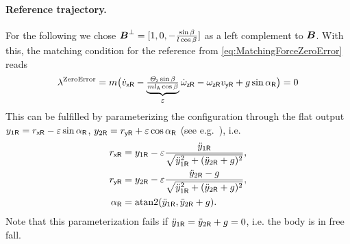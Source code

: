 
\paragraph{Reference trajectory.}
For the following we chose $\boldsymbol{B}^\bot = [1, 0, -\tfrac{\sin\beta}{l \cos\beta}]$ as a left complement to $\boldsymbol{B}$.
With this, the matching condition for the reference from \eqref{eq:MatchingForceZeroError} reads
\begin{align}
 \lambda^{\text{ZeroError}} = m \big(\dot{v}_{\mathsf{x}\mathsf{R}} - \underbrace{\tfrac{\varTheta_{\mathsf{z}} \sin\beta}{m l_{\mathsf{A}} \cos\beta}}_{\varepsilon} \dot{\omega}_{\mathsf{z}\mathsf{R}} - \omega_{\mathsf{z}\mathsf{R}} v_{\mathsf{y}\mathsf{R}} + g \sin\alpha_{\mathsf{R}} \big) = 0
\end{align}
This can be fulfilled by parameterizing the configuration through the flat output $y_{1\mathsf{R}} = r_{\mathsf{x}\mathsf{R}} - \varepsilon \sin\alpha_{\mathsf{R}}$, $y_{2\mathsf{R}} = r_{\mathsf{y}\mathsf{R}} + \varepsilon \cos\alpha_{\mathsf{R}}$ (see e.g.\ \cite{Fliess:LieBacklund}), i.e.
\begin{align}
 r_{\mathsf{x}\mathsf{R}} &= y_{1\mathsf{R}} - \varepsilon \frac{\ddot{y}_{1\mathsf{R}}}{\sqrt{\ddot{y}_{1\mathsf{R}}^2 + (\ddot{y}_{2\mathsf{R}}+g)^2}},
\\
 r_{\mathsf{y}\mathsf{R}} &= y_{2\mathsf{R}} - \varepsilon \frac{\ddot{y}_{2\mathsf{R}}-g}{\sqrt{\ddot{y}_{1\mathsf{R}}^2 + (\ddot{y}_{2\mathsf{R}}+g)^2}},
\\
 \alpha_{\mathsf{R}} &= \operatorname{atan2}(\ddot{y}_{1\mathsf{R}}, \ddot{y}_{2\mathsf{R}}+g).
\end{align}
Note that this parameterization fails if $\ddot{y}_{1\mathsf{R}} = \ddot{y}_{2\mathsf{R}}+g = 0$, i.e. the body is in free fall.

